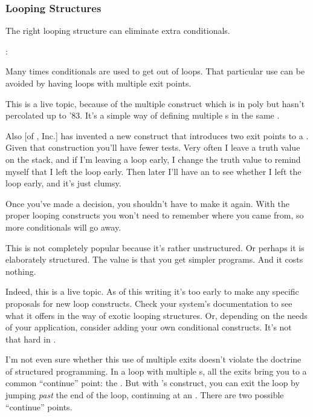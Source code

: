\subsubsection{Looping Structures}%
%
The right looping structure can eliminate extra conditionals.
\begin{interview}
:
\begin{tfquot}
Many times conditionals are used to get out of loops. That particular use
can be avoided by having loops with multiple exit points.

This is a live topic, because of the multiple  construct
which is in poly\Forth{} but hasn't percolated up to \Forth{} '83. It's a
simple way of defining multiple s in the same
.

Also  [of \Forth{}, Inc.]
has invented a new construct that introduces two exit points to a
. Given that construction you'll
have fewer tests. Very often I leave a truth value on the stack, and if
I'm leaving a loop early, I change the truth value to remind myself that I
left the loop early. Then later I'll have an  to see whether I
left the loop early, and it's just clumsy.

Once you've made a decision, you shouldn't have to make it again. With the
proper looping constructs you won't need to remember where you came from,
so more conditionals will go away.

This is not completely popular because it's rather unstructured. Or perhaps
it is elaborately structured. The value is that you get simpler programs.
And it costs nothing.
\end{tfquot}
\end{interview}
Indeed, this is a live topic. As of this writing it's too early to make
any specific proposals for new loop constructs. Check your system's
documentation to see what it offers in the way of exotic looping
structures.  Or, depending on the needs of your application, consider
adding your own conditional constructs. It's not that hard in \Forth{}.

I'm not even sure whether this use of multiple exits doesn't violate the
doctrine of structured programming. In a
loop with multiple s, all the exits bring you to a common
``continue'' point: the . But with 's
 construct, you
can exit the loop by jumping \emph{past} the end of the loop, continuing
at an . There are two possible ``continue'' points.

